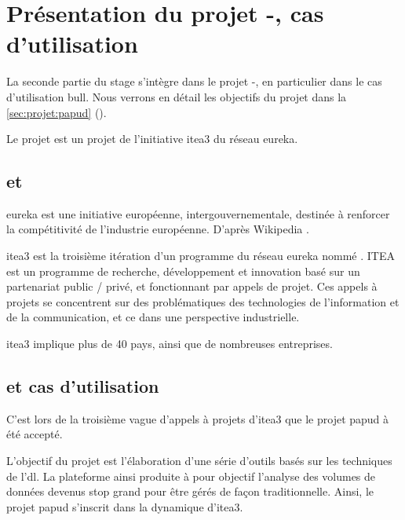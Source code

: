 %
%

\section{Présentation du projet -, cas d'utilisation }
La seconde partie du stage s'intègre dans le projet -, en particulier dans le cas d'utilisation \gls{bull}. Nous verrons en détail les objectifs du projet dans la \autoref{sec:projet:papud} ().

Le projet  est un projet de l'initiative \gls{itea3} du réseau \gls{eureka}.

\subsection{ et }
\og\gls{eureka} est une initiative européenne, intergouvernementale, destinée à renforcer la compétitivité de l’industrie européenne.\fg{} D'après Wikipedia \autocite{wiki_eureka}.

\gls{itea3} est la troisième itération d'un programme du réseau \gls{eureka} nommé .
ITEA est un programme de recherche, développement et innovation basé sur un partenariat public / privé, et fonctionnant par appels de projet.
Ces appels à projets se concentrent sur des problématiques des technologies de l'information et de la communication, et ce dans une perspective industrielle.

\gls{itea3} implique plus de 40 pays, ainsi que de nombreuses entreprises.


\subsection{ et cas d'utilisation }
C'est lors de la troisième vague d'appels à projets d'\gls{itea3} que le projet \gls{papud} à été accepté.

L'objectif du projet  est l'élaboration d'une série d'outils basés sur les techniques de l'\gls{dl}.
La plateforme ainsi produite à pour objectif l'analyse des volumes de données devenus stop grand pour être gérés de façon traditionnelle.
Ainsi, le projet \gls{papud} s'inscrit dans la dynamique d'\gls{itea3}.

